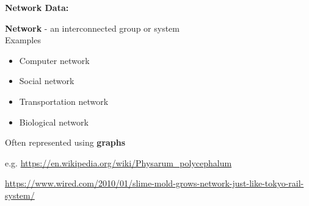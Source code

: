 \documentclass[aspectratio=169]{beamer}
\begin{document}
\begin{frame}
	
	\begin{columns}
		\begin{column}{0.6\textwidth}
			
			\textbf{Network Data:}
			
			\vspace{6mm}
			
			\textbf{Network} - an interconnected group or system \\
			\vspace{3mm}
			Examples
			\begin{itemize}
				\item Computer network
				\item Social network
				\item Transportation network
				\item Biological network
			\end{itemize} \vspace{3mm}
			Often represented using \textbf{graphs}
			
			\vspace{2mm}
			
			\tiny e.g. \url{https://en.wikipedia.org/wiki/Physarum_polycephalum}
			
			\vspace{2mm}
			
			\tiny \url{https://www.wired.com/2010/01/slime-mold-grows-network-just-like-tokyo-rail-system/}
		\end{column}
		

\end{columns}
\end{frame}
\end{document}
